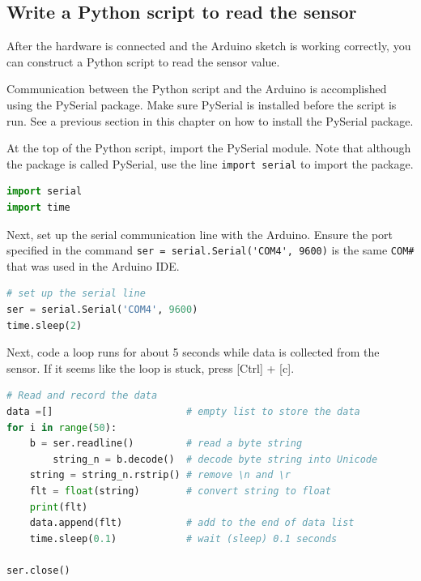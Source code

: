 \documentclass{book}
\begin{document}
    
        \subsection{Write a Python script to read the
sensor}\label{write-a-python-script-to-read-the-sensor}
    




    
        After the hardware is connected and the Arduino sketch is working
correctly, you can construct a Python script to read the sensor value.

Communication between the Python script and the Arduino is accomplished
using the PySerial package. Make sure PySerial is installed before the
script is run. See a previous section in this chapter on how to install
the PySerial package.

At the top of the Python script, import the PySerial module. Note that
although the package is called PySerial, use the line
\lstinline!import serial! to import the package.
    




    
        \begin{lstlisting}[language=Python]
import serial
import time
\end{lstlisting}
    




    
        Next, set up the serial communication line with the Arduino. Ensure the
port specified in the command
\lstinline!ser = serial.Serial('COM4', 9600)! is the same
\lstinline!COM#! that was used in the Arduino IDE.
    




    
        \begin{lstlisting}[language=Python]
# set up the serial line
ser = serial.Serial('COM4', 9600)
time.sleep(2)
\end{lstlisting}
    




    
        Next, code a loop runs for about 5 seconds while data is collected from
the sensor. If it seems like the loop is stuck, press {[}Ctrl{]} +
{[}c{]}.
    




    
        \begin{lstlisting}[language=Python]
# Read and record the data
data =[]                       # empty list to store the data
for i in range(50):
    b = ser.readline()         # read a byte string
        string_n = b.decode()  # decode byte string into Unicode  
    string = string_n.rstrip() # remove \n and \r
    flt = float(string)        # convert string to float
    print(flt)
    data.append(flt)           # add to the end of data list
    time.sleep(0.1)            # wait (sleep) 0.1 seconds

ser.close()
\end{lstlisting}
    
\end{document}
